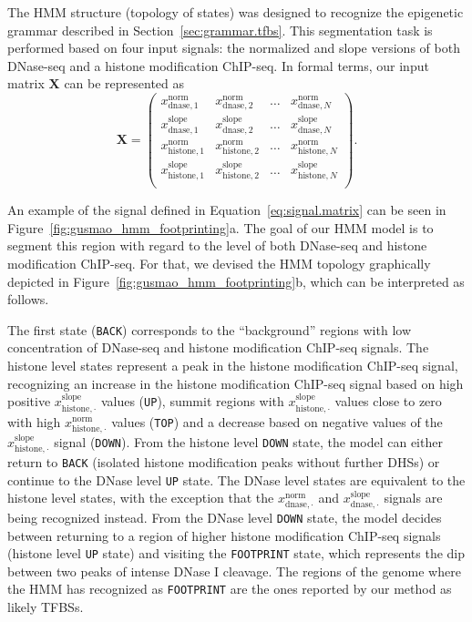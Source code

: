 The HMM structure (topology of states) was designed to recognize the epigenetic grammar described in Section~\ref{sec:grammar.tfbs}. This segmentation task is performed based on four input signals: the normalized and slope versions of both DNase-seq and a histone modification ChIP-seq. In formal terms, our input matrix $\mathbf{X}$ can be represented as
\begin{equation}
  \label{eq:signal.matrix}
  \mathbf{X} = 
  \begin{pmatrix}
    x^{\text{norm}}_{\text{dnase},1} & x^{\text{norm}}_{\text{dnase},2} & \dots & x^{\text{norm}}_{\text{dnase},N} \\[1em]
    x^{\text{slope}}_{\text{dnase},1} & x^{\text{slope}}_{\text{dnase},2} & \dots & x^{\text{slope}}_{\text{dnase},N} \\[1em]
    x^{\text{norm}}_{\text{histone},1} & x^{\text{norm}}_{\text{histone},2} & \dots & x^{\text{norm}}_{\text{histone},N} \\[1em]
    x^{\text{slope}}_{\text{histone},1} & x^{\text{slope}}_{\text{histone},2} & \dots & x^{\text{slope}}_{\text{histone},N} \\
  \end{pmatrix}.
\end{equation}

An example of the signal defined in Equation~\ref{eq:signal.matrix} can be seen in Figure~\ref{fig:gusmao_hmm_footprinting}a. The goal of our HMM model is to segment this region with regard to the level of both DNase-seq and histone modification ChIP-seq. For that, we devised the HMM topology graphically depicted in Figure~\ref{fig:gusmao_hmm_footprinting}b, which can be interpreted as follows.

The first state ({\tt BACK}) corresponds to the ``background'' regions with low concentration of DNase-seq and histone modification ChIP-seq signals. The histone level states represent a peak in the histone modification ChIP-seq signal, recognizing an increase in the histone modification ChIP-seq signal based on high positive $x^{\text{slope}}_{\text{histone},\cdot}$ values ({\tt UP}), summit regions with $x^{\text{slope}}_{\text{histone},\cdot}$ values close to zero with high $x^{\text{norm}}_{\text{histone},\cdot}$ values ({\tt TOP}) and a decrease based on negative values of the $x^{\text{slope}}_{\text{histone},\cdot}$ signal ({\tt DOWN}). From the histone level {\tt DOWN} state, the model can either return to {\tt BACK} (isolated histone modification peaks without further DHSs) or continue to the DNase level {\tt UP} state. The DNase level states are equivalent to the histone level states, with the exception that the $x^{\text{norm}}_{\text{dnase},\cdot}$ and $x^{\text{slope}}_{\text{dnase},\cdot}$ signals are being recognized instead. From the DNase level {\tt DOWN} state, the model decides between returning to a region of higher histone modification ChIP-seq signals (histone level {\tt UP} state) and visiting the {\tt FOOTPRINT} state, which represents the dip between two peaks of intense DNase I cleavage. The regions of the genome where the HMM has recognized as {\tt FOOTPRINT} are the ones reported by our method as likely TFBSs.

